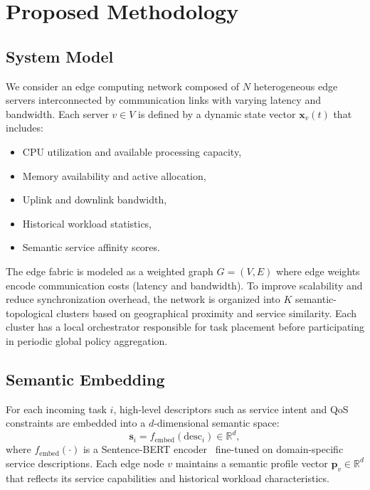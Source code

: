 \section{Proposed Methodology}
\label{sec:methodology}

\subsection{System Model}
We consider an edge computing network composed of $N$ heterogeneous edge servers interconnected by communication links with varying latency and bandwidth. Each server $v \in V$ is defined by a dynamic state vector $\mathbf{x}_v(t)$ that includes:
\begin{itemize}
	\item CPU utilization and available processing capacity,
	\item Memory availability and active allocation,
	\item Uplink and downlink bandwidth,
	\item Historical workload statistics,
	\item Semantic service affinity scores.
\end{itemize}

The edge fabric is modeled as a weighted graph $G = (V, E)$ where edge weights encode communication costs (latency and bandwidth). To improve scalability and reduce synchronization overhead, the network is organized into $K$ semantic-topological clusters based on geographical proximity and service similarity. Each cluster has a local orchestrator responsible for task placement before participating in periodic global policy aggregation.

\subsection{Semantic Embedding}
For each incoming task $i$, high-level descriptors such as service intent and QoS constraints are embedded into a $d$-dimensional semantic space:
\begin{equation}
	\mathbf{s}_i = f_{\text{embed}}(\text{desc}_i) \in \mathbb{R}^d,
\end{equation}
where $f_{\text{embed}}(\cdot)$ is a Sentence-BERT encoder~\cite{Reimers2019_SentenceBERT} fine-tuned on domain-specific service descriptions. Each edge node $v$ maintains a semantic profile vector $\mathbf{p}_v \in \mathbb{R}^d$ that reflects its service capabilities and historical workload characteristics.

